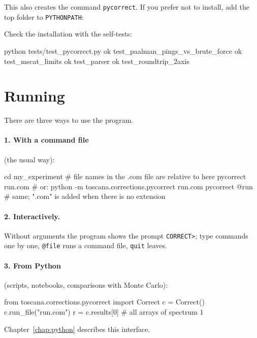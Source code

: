 \documentclass[11pt,a4paper]{report}
\newcommand{\cmd}[1]{\texttt{\color{accent}#1}}
\newcommand{\code}[1]{\texttt{#1}}
\begin{document}
This also creates the command \code{pycorrect}. If you prefer not to install,
add the top folder to \code{PYTHONPATH}:


Check the installation with the self-tests:

\begin{shell}
python tests/test_pycorrect.py
ok  test_paalman_pings_vs_brute_force
ok  test_mscat_limits
ok  test_parser
ok  test_roundtrip_2axis
\end{shell}

\section{Running}

There are three ways to use the program.

\paragraph{1. With a command file} (the usual way):
\begin{shell}
cd my_experiment            # file names in the .com file are relative to here
pycorrect run.com           # or: python -m toscana.corrections.pycorrect run.com
pycorrect @run              # same; ".com" is added when there is no extension
\end{shell}

\paragraph{2. Interactively.} Without arguments the program shows the prompt
\code{CORRECT>}; type commands one by one, \code{@file} runs a command file,
\cmd{quit} leaves.

\paragraph{3. From Python} (scripts, notebooks, comparisons with Monte Carlo):
\begin{py}
from toscana.corrections.pycorrect import Correct
c = Correct()
c.run_file("run.com")
r = c.results[0]          # all arrays of spectrum 1
\end{py}
Chapter~\ref{chap:python} describes this interface.
\end{document}
